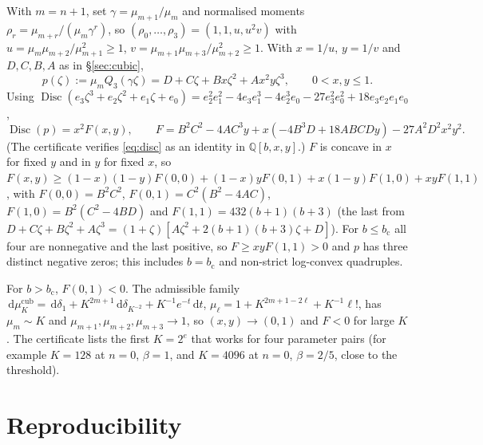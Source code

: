\documentclass[11pt,a4paper]{article}
\theoremstyle{definition}
\theoremstyle{remark}
\newcommand{\dd}{\,\mathrm{d}}
\newcommand{\Disc}{\operatorname{Disc}}
\newcommand{\bc}{b_{\mathrm c}}
\begin{document}
With $m=n+1$, set $\gamma=\mu_{m+1}/\mu_m$ and normalised moments
$\rho_r=\mu_{m+r}/(\mu_m\gamma^r)$, so $(\rho_0,\dots,\rho_3)=(1,1,u,u^2v)$ with
$u=\mu_m\mu_{m+2}/\mu_{m+1}^2\ge1$, $v=\mu_{m+1}\mu_{m+3}/\mu_{m+2}^2\ge1$.
With $x=1/u$, $y=1/v$ and $D,C,B,A$ as in \S\ref{sec:cubic},
\[
 p(\zeta):=\mu_mQ_3(\gamma\zeta)=D+C\zeta+Bx\zeta^2+Ax^2y\zeta^3,\qquad0<x,y\le1 .
\]
Using $\Disc(e_3\zeta^3+e_2\zeta^2+e_1\zeta+e_0)=e_2^2e_1^2-4e_3e_1^3-4e_2^3e_0
-27e_3^2e_0^2+18e_3e_2e_1e_0$,
\begin{equation}\label{eq:disc}
 \Disc(p)=x^2F(x,y),\qquad
 F=B^2C^2-4AC^3y+x(-4B^3D+18ABCDy)-27A^2D^2x^2y^2 .
\end{equation}
(The certificate verifies \eqref{eq:disc} as an identity in $\mathbb Q[b,x,y]$.)
$F$ is concave in $x$ for fixed $y$ and in $y$ for fixed $x$, so
$F(x,y)\ge(1-x)(1-y)F(0,0)+(1-x)yF(0,1)+x(1-y)F(1,0)+xyF(1,1)$, with
$F(0,0)=B^2C^2$, $F(0,1)=C^2(B^2-4AC)$, $F(1,0)=B^2(C^2-4BD)$ and
$F(1,1)=432(b+1)(b+3)$ (the last from
$D+C\zeta+B\zeta^2+A\zeta^3=(1+\zeta)[A\zeta^2+2(b+1)(b+3)\zeta+D]$). For
$b\le\bc$ all four are nonnegative and the last positive, so
$F\ge xyF(1,1)>0$ and $p$ has three distinct negative zeros; this includes
$b=\bc$ and non-strict log-convex quadruples.

For $b>\bc$, $F(0,1)<0$. The admissible family
$\dd\mu^{\mathrm{cub}}_K=\dd\delta_1+K^{2m+1}\dd\delta_{K^{-2}}+K^{-1}e^{-t}\dd t$,
$\mu_\ell=1+K^{2m+1-2\ell}+K^{-1}\ell!$, has $\mu_m\sim K$ and
$\mu_{m+1},\mu_{m+2},\mu_{m+3}\to1$, so $(x,y)\to(0,1)$ and $F<0$ for large
$K$. The certificate lists the first $K=2^e$ that works for four
parameter pairs (for example $K=128$ at $n=0$, $\beta=1$, and $K=4096$ at
$n=0$, $\beta=2/5$, close to the threshold).

\section{Reproducibility}\label{app:repro}
\end{document}
